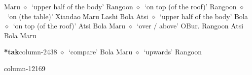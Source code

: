\hspace{1ex}
         Maru 
\hspace{1ex}
         $\diamond$~`upper half of the body'
         Rangoon 
\hspace{1ex}
         $\diamond$~`on top (of the roof)'
         Rangoon 
\hspace{1ex}
         $\diamond$~`on (the table)'
         Xiandao 
\hspace{1ex}
         Maru 
\hspace{1ex}
         Lashi 
\hspace{1ex}
         Bola 
\hspace{1ex}
         Atsi 
\hspace{1ex}
         $\diamond$~`upper half of the body'
         Bola 
\hspace{1ex}
         $\diamond$~`on top (of the roof)'
         Atsi 
\hspace{1ex}
         Bola 
\hspace{1ex}
         Maru 
\hspace{1ex}
         $\diamond$~`over / above'
         OBur. 
\hspace{1ex}
         Rangoon 
\hspace{1ex}
         Atsi 
\hspace{1ex}
         Bola 
\hspace{1ex}
         Maru 
  \item {\footnotesize \textbf{*tak}}{\tiny column-2438}
         $\diamond$~`compare'
         Bola 
\hspace{1ex}
         Maru 
\hspace{1ex}
         $\diamond$~`upwards'
         Rangoon 
  \item {\footnotesize \textbf{}}{\tiny column-12169}
